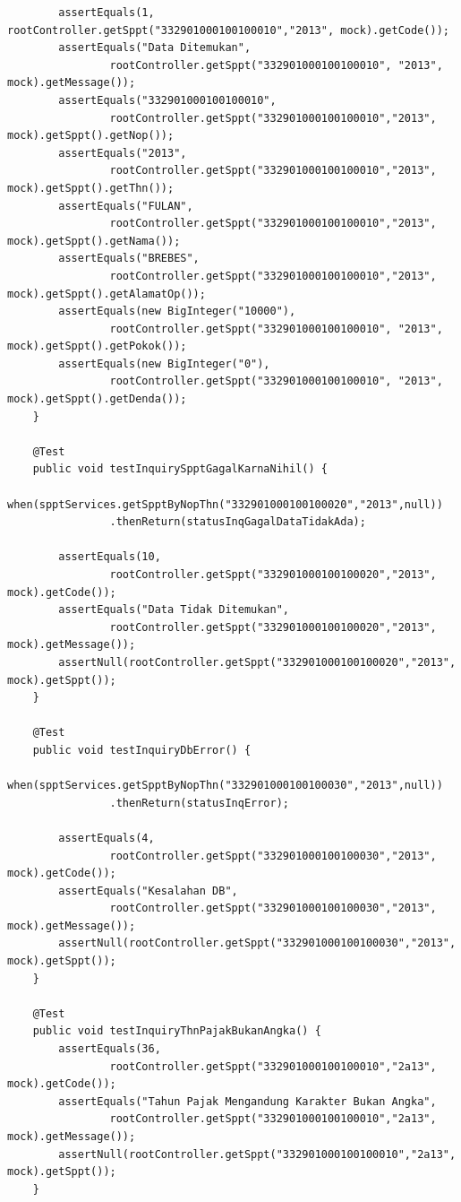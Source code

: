 \documentclass[pdftex,12pt, oneside]{article}
\begin{document}
\begin{enumerate}[A.]
\begin{enumerate}[1.]
\begin{lstlisting}
        assertEquals(1, rootController.getSppt("332901000100100010","2013", mock).getCode());
        assertEquals("Data Ditemukan",
                rootController.getSppt("332901000100100010", "2013", mock).getMessage());
        assertEquals("332901000100100010",
                rootController.getSppt("332901000100100010","2013", mock).getSppt().getNop());
        assertEquals("2013",
                rootController.getSppt("332901000100100010","2013", mock).getSppt().getThn());
        assertEquals("FULAN",
                rootController.getSppt("332901000100100010","2013", mock).getSppt().getNama());
        assertEquals("BREBES",
                rootController.getSppt("332901000100100010","2013", mock).getSppt().getAlamatOp());
        assertEquals(new BigInteger("10000"),
                rootController.getSppt("332901000100100010", "2013", mock).getSppt().getPokok());
        assertEquals(new BigInteger("0"),
                rootController.getSppt("332901000100100010", "2013", mock).getSppt().getDenda());
    }

    @Test
    public void testInquirySpptGagalKarnaNihil() {
        when(spptServices.getSpptByNopThn("332901000100100020","2013",null))
                .thenReturn(statusInqGagalDataTidakAda);

        assertEquals(10,
                rootController.getSppt("332901000100100020","2013", mock).getCode());
        assertEquals("Data Tidak Ditemukan",
                rootController.getSppt("332901000100100020","2013", mock).getMessage());
        assertNull(rootController.getSppt("332901000100100020","2013", mock).getSppt());
    }

    @Test
    public void testInquiryDbError() {
        when(spptServices.getSpptByNopThn("332901000100100030","2013",null))
                .thenReturn(statusInqError);

        assertEquals(4,
                rootController.getSppt("332901000100100030","2013", mock).getCode());
        assertEquals("Kesalahan DB",
                rootController.getSppt("332901000100100030","2013", mock).getMessage());
        assertNull(rootController.getSppt("332901000100100030","2013", mock).getSppt());
    }

    @Test
    public void testInquiryThnPajakBukanAngka() {
        assertEquals(36,
                rootController.getSppt("332901000100100010","2a13", mock).getCode());
        assertEquals("Tahun Pajak Mengandung Karakter Bukan Angka",
                rootController.getSppt("332901000100100010","2a13", mock).getMessage());
        assertNull(rootController.getSppt("332901000100100010","2a13", mock).getSppt());
    }


\end{lstlisting}
\end{enumerate}
\end{enumerate}
\end{document}
